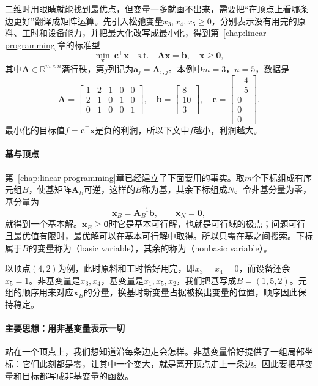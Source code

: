 二维时用眼睛就能找到最优点，但变量一多就画不出来，需要把“在顶点上看哪条边更好”翻译成矩阵运算。先引入松弛变量$x_3,x_4,x_5\geq0$，分别表示没有用完的原料、工时和设备能力，并把最大化改写成最小化，得到第~\ref{chap:linear-programming}章的标准型
\begin{equation}
 \min_{\bm{x}}\ \bm{c}^\top\bm{x}\quad\text{s.t.}\quad \bm{A}\bm{x}=\bm{b},\quad \bm{x}\geq\bm{0},
 \label{eq:simplex-standard-form}
\end{equation}
其中$\bm{A}\in\mathbb{R}^{m\times n}$满行秩，第$j$列记为$\bm{a}_j=\bm{A}_{:,j}$。本例中$m=3$，$n=5$，数据是
\begin{equation}
 \bm{A}=\begin{bmatrix}1&2&1&0&0\\2&1&0&1&0\\0&1&0&0&1\end{bmatrix},\quad
 \bm{b}=\begin{bmatrix}8\\10\\3\end{bmatrix},\quad
 \bm{c}=\begin{bmatrix}-4\\-5\\0\\0\\0\end{bmatrix}.
 \label{eq:simplex-resource-data}
\end{equation}
最小化的目标值$f=\bm{c}^\top\bm{x}$是负的利润，所以下文中$f$越小，利润越大。

\paragraph{基与顶点}
第~\ref{chap:linear-programming}章已经建立了下面要用的事实。取$m$个下标组成有序元组$B$，使基矩阵$\bm{A}_B$可逆，这样的$B$称为基，其余下标组成$N$。令非基分量为零，基分量为
\[
 \bm{x}_B=\bm{A}_B^{-1}\bm{b},\qquad \bm{x}_N=\bm{0},
\]
就得到一个基本解。$\bm{x}_B\geq\bm{0}$时它是基本可行解，也就是可行域的极点；问题可行且最优值有限时，最优解可以在基本可行解中取得。所以只需在基之间搜索。下标属于$B$的变量称为（basic variable），其余的称为（nonbasic variable）。

以顶点$(4,2)$为例，此时原料和工时恰好用完，即$x_3=x_4=0$，而设备还余$x_5=1$。非基变量是$x_3,x_4$，基变量是$x_1,x_5,x_2$，我们把基写成$B=(1,5,2)$。元组的顺序用来对应$\bm{x}_B$的分量，换基时新变量占据被换出变量的位置，顺序因此保持稳定。

\paragraph{主要思想：用非基变量表示一切}
站在一个顶点上，我们想知道沿每条边走会怎样。非基变量恰好提供了一组局部坐标：它们此刻都是零，让其中一个变大，就是离开顶点走上一条边。因此要把基变量和目标都写成非基变量的函数。

